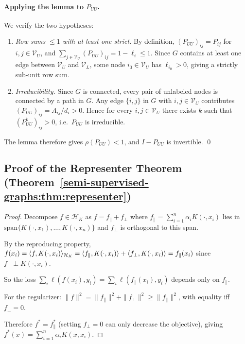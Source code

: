 \begin{notechapter}
\paragraph{Applying the lemma to $P_{UU}$.}
We verify the two hypotheses:
\begin{enumerate}
  \item \emph{Row sums $\leq 1$ with at least one strict.}
    By definition, $(P_{UU})_{ij} = P_{ij}$ for $i,j \in \mathcal{V}_U$, and
    $\sum_{j \in \mathcal{V}_U}(P_{UU})_{ij} = 1 - \ell_i \leq 1$.  Since $G$
    contains at least one edge between $\mathcal{V}_U$ and $\mathcal{V}_L$,
    some node $i_0 \in \mathcal{V}_U$ has $\ell_{i_0} > 0$, giving a strictly
    sub-unit row sum.
  \item \emph{Irreducibility.}
    Since $G$ is connected, every pair of unlabeled nodes is connected by a
    path in $G$.  Any edge $\{i,j\}$ in $G$ with $i,j \in \mathcal{V}_U$
    contributes $(P_{UU})_{ij} = A_{ij}/d_i > 0$.  Hence for every $i,j \in
    \mathcal{V}_U$ there exists $k$ such that $(P_{UU}^k)_{ij} > 0$, i.e.\
    $P_{UU}$ is irreducible.
\end{enumerate}
The lemma therefore gives $\rho(P_{UU}) < 1$, and $I - P_{UU}$ is invertible.
\qed

\subsection{Proof of the Representer Theorem (Theorem~\ref{semi-supervised-graphs:thm:representer})}
\label{semi-supervised-graphs:app:representer}

\begin{proof}
Decompose $f \in \mathcal{H}_K$ as $f = f_\parallel + f_\perp$ where
$f_\parallel = \sum_{i=1}^n \alpha_i K(\cdot, x_i)$ lies in
$\text{span}\{K(\cdot, x_1), \ldots, K(\cdot, x_n)\}$ and $f_\perp$ is
orthogonal to this span.

By the reproducing property,
$f(x_i) = \langle f, K(\cdot, x_i) \rangle_{\mathcal{H}_K}
= \langle f_\parallel, K(\cdot, x_i) \rangle + \langle f_\perp, K(\cdot, x_i) \rangle
= f_\parallel(x_i)$ since $f_\perp \perp K(\cdot, x_i)$.

So the loss $\sum_i \ell(f(x_i), y_i) = \sum_i \ell(f_\parallel(x_i), y_i)$
depends only on $f_\parallel$.

For the regularizer: $\|f\|^2 = \|f_\parallel\|^2 + \|f_\perp\|^2
\geq \|f_\parallel\|^2$, with equality iff $f_\perp = 0$.

Therefore $f^* = f_\parallel^*$ (setting $f_\perp = 0$ can only decrease the
objective), giving $f^*(x) = \sum_{i=1}^n \alpha_i K(x, x_i)$.


\end{proof}
\end{notechapter}
